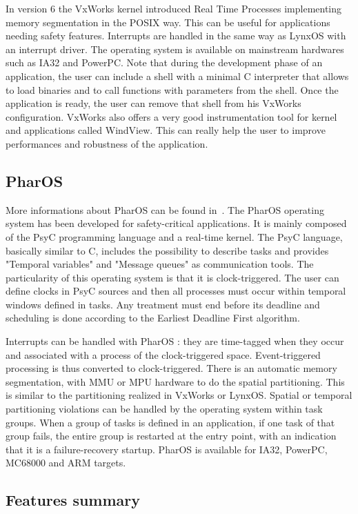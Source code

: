 \documentclass[10pt]{report}
\begin{document}
In version 6 the VxWorks kernel introduced Real Time Processes implementing memory segmentation in the POSIX way. This can be useful for 
applications needing safety features. Interrupts are handled in the same way as LynxOS with an interrupt driver. The operating system is 
available on mainstream hardwares such as IA32 and PowerPC. Note that during the development phase of an application, the user can include 
a shell with a minimal C interpreter that allows to load binaries and to call functions with parameters from the shell. Once the application 
is ready, the user can remove that shell from his VxWorks configuration. VxWorks also offers a very good instrumentation tool for kernel and 
applications called WindView. This can really help the user to improve performances and robustness of the application.

\subsection{PharOS}

More informations about PharOS can be found in~\cite{OASIS:98}. The PharOS operating system has been developed for safety-critical
applications. It is mainly composed of the PsyC programming language and a real-time kernel. The PsyC language, basically similar to C, 
includes the possibility to describe tasks and provides "Temporal variables" and "Message queues" as communication tools.
The particularity of this operating system is that it is clock-triggered. The user can define clocks in PsyC sources and then all
processes must occur within temporal windows defined in tasks. Any treatment must end before its deadline and scheduling is done according
to the Earliest Deadline First algorithm.

Interrupts can be handled with PharOS : they are time-tagged when they occur and associated with a process of the clock-triggered
space. Event-triggered processing is thus converted to clock-triggered. There is an automatic memory segmentation, with MMU
or MPU hardware to do the spatial partitioning. This is similar to the partitioning realized in VxWorks or LynxOS. Spatial or temporal
partitioning violations can be handled by the operating system within task groups. When a group of tasks is defined in an application, if 
one task of that group fails, the entire group is restarted at the entry point, with an indication that it is a failure-recovery 
startup. PharOS is available for IA32, PowerPC, MC68000 and ARM targets.

\subsection{Features summary}
\end{document}
